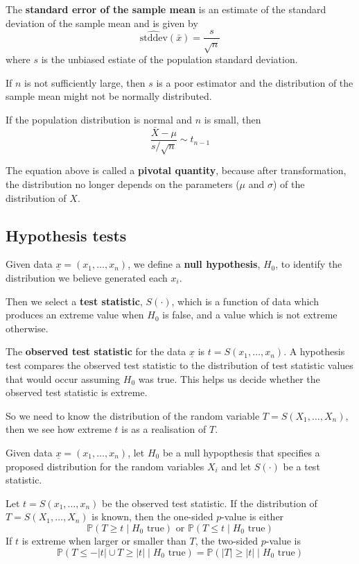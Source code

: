 \begin{definition}
	The \textbf{standard error of the sample mean} is an estimate of the standard deviation of the sample mean and is given by
	\[
		\widehat{\text{stddev}}(\bar{x}) = \frac{s}{\sqrt{n}}
	\]
	where $s$ is the unbiased estiate of the population standard deviation.
\end{definition}

\begin{remark}
	If $n$ is not sufficiently large, then $s$ is a poor estimator and the distribution of the sample mean might not be normally distributed.

	If the population distribution is normal and $n$ is small, then
	\[
		\frac{\bar{X} - \mu}{s / \sqrt{n}} \sim t_{n - 1}
	\]
\end{remark}

\begin{definition}
	The equation above is called a \textbf{pivotal quantity}, because after transformation, the distribution no longer depends on the parameters ($\mu$ and $\sigma$) of the distribution of $X$.
\end{definition}

\subsection{Hypothesis tests}

\begin{definition}
	Given data $\underline{x} = (x_1, \dots, x_n)$, we define a \textbf{null hypothesis}, $H_0$, to identify the distribution we believe generated each $x_i$.

	Then we select a \textbf{test statistic}, $S(\cdot)$, which is a function of data which produces an extreme value when $H_0$ is false, and a value which is not extreme otherwise.

	The \textbf{observed test statistic} for the data $\underline{x}$ is $t = S(x_1, \dots, x_n)$. A hypothesis test compares the observed test statistic to the distribution of test statistic values that would occur assuming $H_0$ was true. This helps us decide whether the observed test statistic is extreme.

	So we need to know the distribution of the random variable $T = S(X_1, \dots, X_n)$, then we see how extreme $t$ is as a realisation of $T$.
\end{definition}

\begin{definition}
	Given data $\underline{x} = (x_1, \dots, x_n)$, let $H_0$ be a null hypopthesis that specifies a proposed distribution for the random variables $X_i$ and let $S(\cdot)$ be a test statistic.

	Let $t = S(x_1, \dots, x_n)$ be the observed test statistic. If the distribution of $T = S(X_1, \dots, X_n)$ is known, then the one-sided $p$-value is either
	\[
		\mathbb{P}(T \ge t \mid H_0 \text{ true}) \text{ \ or \ } \mathbb{P}(T \le t \mid H_0 \text{ true})
	\]
	If $t$ is extreme when larger or smaller than $T$, the two-sided $p$-value is
	\[
		\mathbb{P}(T \le -|t| \cup T \ge |t| \mid H_0 \text{ true} ) = \mathbb{P}(|T| \ge |t| \mid H_0 \text{ true})
	\]
\end{definition}

